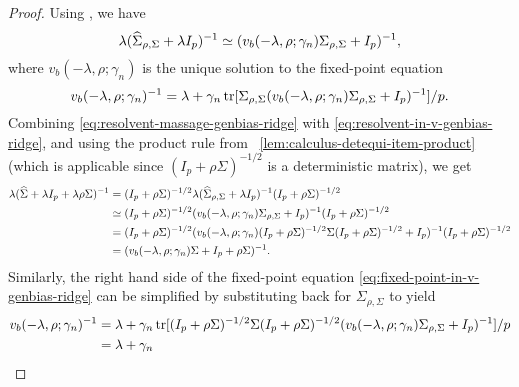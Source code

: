 \documentclass{article}
\begin{document}
\begin{proof}
   Using 
   ,
   we have
   \begin{equation}
        \label{eq:resolvent-in-v-genbias-ridge}
        \lambda ({\widehat{\Sigma}}_{\rho, \Sigma} + \lambda I_p)^{-1}
        \simeq (v_b(-\lambda, \rho; \gamma_n) \Sigma_{\rho, \Sigma} + I_p)^{-1},
   \end{equation}
   where $v_b(-\lambda, \rho; \gamma_n)$
   is the unique solution to the fixed-point equation
   \begin{equation}
        \label{eq:fixed-point-in-v-genbias-ridge}
        v_b(-\lambda, \rho; \gamma_n)^{-1}
        = \lambda + \gamma_n 
        \operatorname{tr}[\Sigma_{\rho, \Sigma}  (v_b(-\lambda, \rho; \gamma_n) \Sigma_{\rho, \Sigma} + I_p)^{-1}] / p.
   \end{equation}
   Combining 
   \eqref{eq:resolvent-massage-genbias-ridge}
   with 
   \eqref{eq:resolvent-in-v-genbias-ridge},
   and using the product rule from 
    ~\eqref{lem:calculus-detequi-item-product}
   (which is applicable since $(I_p + \rho \Sigma)^{-1/2}$ is a deterministic matrix),
   we get
   \begin{align*}
        \lambda ({\widehat{\Sigma}} + \lambda I_p + \lambda \rho \Sigma)^{-1}
        &= 
        (I_p + \rho \Sigma)^{-1/2}
        \lambda
        ({\widehat{\Sigma}}_{\rho, \Sigma} + \lambda I_p)^{-1}
        (I_p + \rho \Sigma)^{-1/2}
        \\
        &\simeq
        (I_p + \rho \Sigma)^{-1/2}
        (v_b(-\lambda, \rho; \gamma_n) \Sigma_{\rho, \Sigma} + I_p)^{-1}
        (I_p + \rho \Sigma)^{-1/2} \\
        &= 
        (I_p + \rho \Sigma)^{-1/2}
        (v_b(-\lambda, \rho; \gamma_n) (I_p + \rho \Sigma)^{-1/2} \Sigma (I_p + \rho \Sigma)^{-1/2}  + I_p)^{-1}
        (I_p + \rho \Sigma)^{-1/2} \\
        &=
        (v_b(-\lambda, \rho; \gamma_n) \Sigma + I_p + \rho \Sigma)^{-1}.
   \end{align*}
   Similarly, 
   the right hand side of the fixed-point equation 
   \eqref{eq:fixed-point-in-v-genbias-ridge} 
   can be simplified
   by substituting back for $\Sigma_{\rho, \Sigma}$ to yield
   \begin{align}
       v_b(-\lambda, \rho; \gamma_n)^{-1}
       &= \lambda + \gamma_n 
       \tr[(I_p + \rho \Sigma)^{-1/2} \Sigma (I_p + \rho \Sigma)^{-1/2} 
       (v_b(-\lambda, \rho; \gamma_n) \Sigma_{\rho, \Sigma} + I_p)^{-1}] / p \nonumber \\
       &=
       \lambda + \gamma_n

\end{align}
\end{proof}
\end{document}
